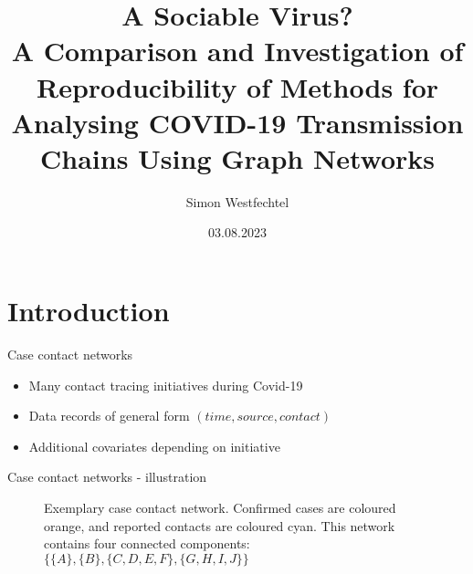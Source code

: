 \documentclass{beamer}
\title{A Sociable Virus?\\
	A Comparison and Investigation of Reproducibility of
	Methods for Analysing COVID-19 Transmission Chains
	Using Graph Networks}
\author{Simon Westfechtel}
\date{03.08.2023}
\begin{document}
	\frame{\titlepage}
	
	\section{Introduction}
	
	\begin{frame}{Case contact networks}
		\begin{itemize}
			\item Many contact tracing initiatives during Covid-19
			\item Data records of general form $(time,source,contact)$
			\item Additional covariates depending on initiative
		\end{itemize}
	\end{frame}

	\begin{frame}{Case contact networks - illustration}
		\begin{figure}
				\centering
				\caption{Exemplary case contact network. Confirmed cases are coloured orange, and reported contacts are coloured cyan. This network contains four connected components: $\{\{A\},\{B\},\{C,D,E,F\},\{G,H,I,J\}\}$}
				\label{fig:example_case_network}
		\end{figure}
	\end{frame}
\end{document}
